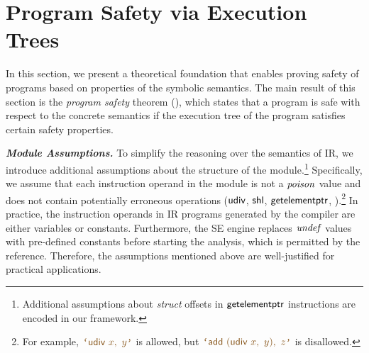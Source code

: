 \section{Program Safety via Execution Trees}
\label{sec:program-safety}

In this section,
we present a theoretical foundation that enables proving safety of programs based on properties of the symbolic semantics.
The main result of this section is the \emph{program safety} theorem (),
which states that a program is safe with respect to the concrete semantics if the execution tree of the program satisfies certain safety properties.

\textbf{\textit{{Module Assumptions.}}}
To simplify the reasoning over the semantics of \llvm IR,
we introduce additional assumptions about the structure of the \llvm module.\footnote{
Additional assumptions about \textit{struct} offsets in $\textsf{getelementptr}$ instructions are encoded in our \coq framework.
}
Specifically,
we assume that each instruction operand in the \llvm module is not a $\mathit{poison}$ value and does not contain potentially erroneous operations ($\textsf{udiv}$, $\textsf{shl}$, $\textsf{getelementptr}$, \etc).\footnote{
For example, $\codequote{\opcode{udiv} ~ x, ~ y}$ is allowed, but $\codequote{\opcode{add} ~ (\opcode{udiv} ~ x, ~ y), ~ z}$ is disallowed.
}
In practice, the instruction operands in \llvm IR programs generated by the compiler are either variables or constants.
Furthermore, the SE engine replaces $\mathit{undef}$ values with pre-defined constants before starting the analysis,
which is permitted by the \llvm reference.
Therefore, the assumptions mentioned above are well-justified for practical applications.


